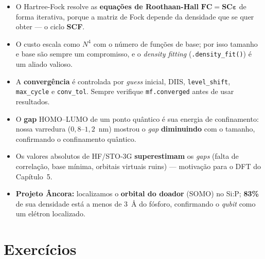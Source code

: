 \documentclass[11pt,a4paper,openany]{book}
\newcommand{\code}[1]{\texttt{#1}}
\newcommand{\qubit}{\emph{qubit}}
\begin{document}
\begin{itemize}[leftmargin=*]
  \item O Hartree-Fock resolve as \textbf{equações de Roothaan-Hall}
        $\mathbf{FC} = \mathbf{SC}\boldsymbol{\varepsilon}$ de forma iterativa,
        porque a matriz de Fock depende da densidade que se quer obter --- o ciclo
        \textbf{SCF}.
  \item O custo escala como $N^4$ com o número de funções de base; por isso
        tamanho e base são sempre um compromisso, e o \emph{density fitting}
        (\code{.density\_fit()}) é um aliado valioso.
  \item A \textbf{convergência} é controlada por \emph{guess} inicial, DIIS,
        \code{level\_shift}, \code{max\_cycle} e \code{conv\_tol}. Sempre verifique
        \code{mf.converged} antes de usar resultados.
  \item O \textbf{gap} HOMO--LUMO de um ponto quântico é sua energia de
        confinamento: nossa varredura ($0{,}8$--$1{,}2$~nm) mostrou o \emph{gap}
        \textbf{diminuindo} com o tamanho, confirmando o confinamento quântico.
  \item Os valores absolutos de HF/STO-3G \textbf{superestimam} os \emph{gaps}
        (falta de correlação, base mínima, orbitais virtuais ruins) --- motivação
        para o DFT do Capítulo~5.
  \item \textbf{Projeto Âncora:} localizamos o \textbf{orbital do doador} (SOMO) no
        Si:P; \textbf{83\%} de sua densidade está a menos de $3$~Å do fósforo,
        confirmando o \qubit{} como um elétron localizado.
\end{itemize}

\section*{Exercícios}
\end{document}

